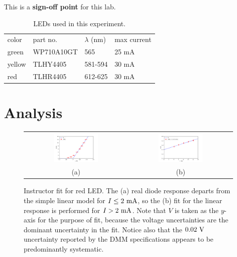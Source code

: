 This is a \textbf{sign-off point} for this lab. 
  
\begin{table}[htbp]
\begin{center}
\caption{LEDs used in this experiment.}
\begin{tabular}{llll}
color & part no. & $\lambda$ (nm) & max current \\
green & WP710A10GT & 565 & 25 mA \\  
yellow & TLHY4405 & 581-594 & 30 mA \\ 
red & TLHR4405 & 612-625 & 30 mA \\ 
\end{tabular}
\end{center}
\end{table}

\section{Analysis}

\begin{figure}[htbp]
\begin{center}
\begin{tabular}{cc}
\includegraphics[width=0.45\textwidth]{figs/labs/planck/fit_diode.pdf} &
\includegraphics[width=0.45\textwidth]{figs/labs/planck/fit_vi.pdf} \\
(a) & (b) \\
\end{tabular}
\end{center}
\caption{Instructor fit for red LED.  The (a) real diode response
  departs from the simple linear model for $I \leq 2~\rm mA$, so the
  (b) fit for the linear response is performed for $I > 2~\rm mA$.
  Note that $V$ is taken as the $y$-axis for the purpose of fit,
  because the voltage uncertainties are the dominant uncertainty in
  the fit.  Notice also that the $0.02~\rm V$ uncertainty reported by
  the DMM specifications appears to be predominantly systematic.}
\label{fig:redfit}
\end{figure}

